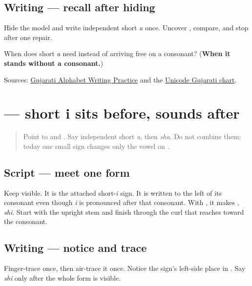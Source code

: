 \subsection*{Writing — recall after hiding}
Hide the model and write independent short \emph{a} once. Uncover \textbf{}, compare, and stop after one repair.

\begin{tcolorbox}[breakable,colback=teal!4,colframe=teal!35!black,title={Before you move on}]
When does short \emph{a} need \textbf{} instead of arriving free on a consonant? (\textbf{When it stands without a consonant.})

Sources: \href{https://www.t30apps.com/gujarati-alphabet-writing/}{Gujarati Alphabet Writing Practice} and the \href{https://www.unicode.org/charts/PDF/U0A80.pdf}{Unicode Gujarati chart}.
\end{tcolorbox}
\section[\texorpdfstring{\gu{િ} (-i)}{િ (-i)}]{ — short i sits before, sounds after}

\label{lesson:GU-W04-i-matra}



\begin{quote}
Point to \textbf{} and \textbf{}. Say independent short \emph{a}, then \emph{sha}. Do not combine them; today one small sign changes only the vowel on \textbf{}.
\end{quote}

\subsection*{Script — meet one form}
Keep \textbf{} visible. It is the attached short-\emph{i} sign. It is written to the left of its consonant even though \emph{i} is pronounced after that consonant. With \textbf{}, it makes \textbf{}, \emph{shi}. Start with the upright stem and finish through the curl that reaches toward the consonant.

\subsection*{Writing — notice and trace}

Finger-trace \textbf{} once, then air-trace it once. Notice the sign's left-side place in \textbf{}. Say \emph{shi} only after the whole form is visible.


